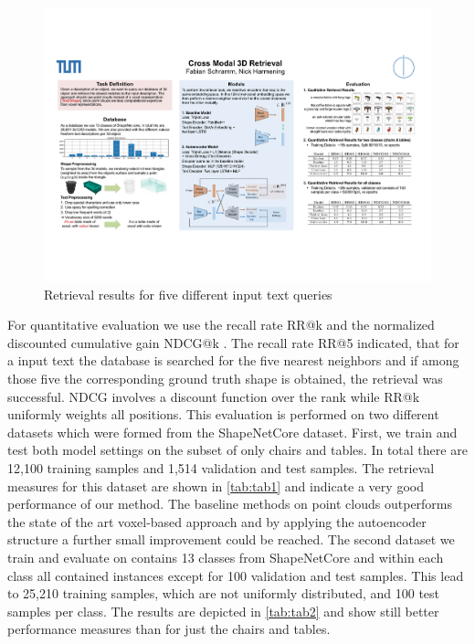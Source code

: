\documentclass[10pt,twocolumn,letterpaper]{article}
\begin{document}
\begin{figure}[t]%
	\centering
	\includegraphics[width=1\linewidth]{fig5.pdf}
	\caption[]{Retrieval results for five different input text queries}
	\label{fig:retrieval}
\end{figure}

For quantitative evaluation we use the recall rate RR@k and the normalized discounted cumulative gain NDCG@k \cite{J_rvelin2002ndcg}. The recall rate RR@5 indicated, that for a input text the database is searched for the five nearest neighbors and if among those five the corresponding ground truth shape is obtained, the retrieval was successful. NDCG involves a discount function over the rank while RR@k uniformly weights all positions. This evaluation is performed on two different datasets which were formed from the ShapeNetCore dataset. First, we train and test both model settings on the subset of only chairs and tables. In total there are  12,100 training samples and 1,514 validation and test samples. The retrieval measures for this dataset are shown in \autoref{tab:tab1} and indicate a very good performance of our method. The baseline methods on point clouds outperforms the state of the art voxel-based approach and by applying the autoencoder structure a further small improvement could be reached. The second dataset we train and evaluate on contains 13 classes from ShapeNetCore and within each class all contained instances except for 100 validation and test samples. This lead to 25,210 training samples, which are not uniformly distributed, and 100 test samples per class. The results are depicted in \autoref{tab:tab2} and show still better performance measures than for just the chairs and tables.
\end{document}
